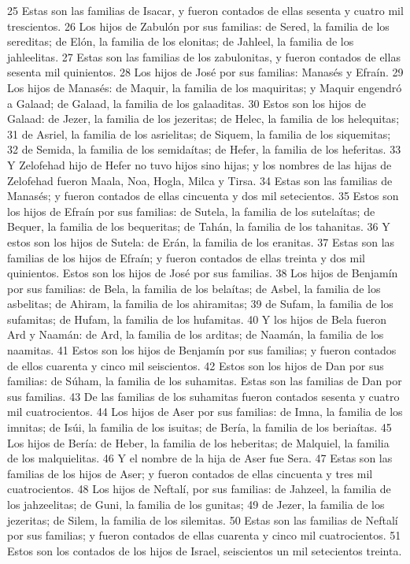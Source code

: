25 Estas son las familias de Isacar, y fueron contados de ellas sesenta y cuatro mil trescientos.
26 Los hijos de Zabulón por sus familias: de Sered, la familia de los sereditas; de Elón, la familia de los elonitas; de Jahleel, la familia de los jahleelitas.
27 Estas son las familias de los zabulonitas, y fueron contados de ellas sesenta mil quinientos.
28 Los hijos de José por sus familias: Manasés y Efraín.
29 Los hijos de Manasés: de Maquir, la familia de los maquiritas; y Maquir engendró a Galaad; de Galaad, la familia de los galaaditas.
30 Estos son los hijos de Galaad: de Jezer, la familia de los jezeritas; de Helec, la familia de los helequitas;
31 de Asriel, la familia de los asrielitas; de Siquem, la familia de los siquemitas;
32 de Semida, la familia de los semidaítas; de Hefer, la familia de los heferitas.
33 Y Zelofehad hijo de Hefer no tuvo hijos sino hijas; y los nombres de las hijas de Zelofehad fueron Maala, Noa, Hogla, Milca y Tirsa.
34 Estas son las familias de Manasés; y fueron contados de ellas cincuenta y dos mil setecientos.
35 Estos son los hijos de Efraín por sus familias: de Sutela, la familia de los sutelaítas; de Bequer, la familia de los bequeritas; de Tahán, la familia de los tahanitas.
36 Y estos son los hijos de Sutela: de Erán, la familia de los eranitas.
37 Estas son las familias de los hijos de Efraín; y fueron contados de ellas treinta y dos mil quinientos. Estos son los hijos de José por sus familias.
38 Los hijos de Benjamín por sus familias: de Bela, la familia de los belaítas; de Asbel, la familia de los asbelitas; de Ahiram, la familia de los ahiramitas;
39 de Sufam, la familia de los sufamitas; de Hufam, la familia de los hufamitas.
40 Y los hijos de Bela fueron Ard y Naamán: de Ard, la familia de los arditas; de Naamán, la familia de los naamitas.
41 Estos son los hijos de Benjamín por sus familias; y fueron contados de ellos cuarenta y cinco mil seiscientos.
42 Estos son los hijos de Dan por sus familias: de Súham, la familia de los suhamitas. Estas son las familias de Dan por sus familias.
43 De las familias de los suhamitas fueron contados sesenta y cuatro mil cuatrocientos.
44 Los hijos de Aser por sus familias: de Imna, la familia de los imnitas; de Isúi, la familia de los isuitas; de Bería, la familia de los beriaítas.
45 Los hijos de Bería: de Heber, la familia de los heberitas; de Malquiel, la familia de los malquielitas.
46 Y el nombre de la hija de Aser fue Sera.
47 Estas son las familias de los hijos de Aser; y fueron contados de ellas cincuenta y tres mil cuatrocientos.
48 Los hijos de Neftalí, por sus familias: de Jahzeel, la familia de los jahzeelitas; de Guni, la familia de los gunitas;
49 de Jezer, la familia de los jezeritas; de Silem, la familia de los silemitas.
50 Estas son las familias de Neftalí por sus familias; y fueron contados de ellas cuarenta y cinco mil cuatrocientos.
51 Estos son los contados de los hijos de Israel, seiscientos un mil setecientos treinta.

